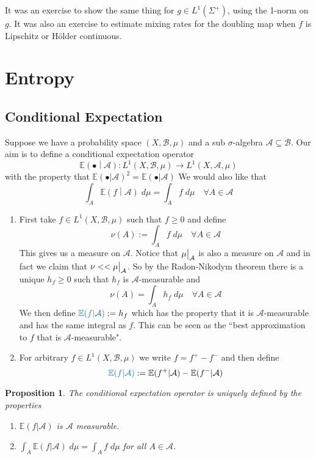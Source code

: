 \documentclass[11pt]{article}
\newcommand{\defeq}{:=}
\newcommand\restr[2]{{%
  \left.\kern-\nulldelimiterspace %
  #1 %
  \vphantom{\big|} %
  \right|_{#2} %
  }}
\newcommand{\relmiddle}[1]{\mathrel{}\middle#1\mathrel{}}
\newcommand{\rmv}{\relmiddle|}
\newcommand{\gvn}[2]{\ensuremath{\left(#1\rmv#2\right)}}
\newcommand{\expg}[2]{\ensuremath{\mathbb{E}\gvn{#1}{#2}}}
\newcommand{\dm}{\;d\mu}
\newcommand{\mdf}[1]{{\color{RoyalBlue} #1}}
\newtheorem{prop}{Proposition}[section]
\begin{document}
It was an exercise to show the same thing for $g\in L^1(\Sigma^+)$, using the 1-norm on $g$.
It was also an exercise to estimate mixing rates for the doubling map when $f$ is Lipschitz or H\"older continuous.

\section{Entropy}

\subsection{Conditional Expectation}
Suppose we have a probability space $(X, \mathcal{B}, \mu)$ and a sub $\sigma$-algebra $\mathcal{A} \subseteq \mathcal{B}$.
Our aim is to define a conditional expectation operator
\[
	\expg{\bullet}{\mathcal{A}}: L^1(X, \mathcal{B}, \mu) \to L^1(X, \mathcal{A}, \mu)
\]
with the property that $\mathbb{E}(\bullet | \mathcal{A})^2=\mathbb{E}(\bullet | \mathcal{A})$
We would also like that
\[
	\int_A \expg{f}{\mathcal{A}} \dm = \int_A f \dm \quad \forall A \in \mathcal{A}
\]

\begin{enumerate}
	\item First take $f\in L^1(X, \mathcal{B}, \mu)$ such that $f\geq 0$ and define
		\[
			\nu(A) \defeq \int_A f \dm \quad \forall A\in\mathcal{A}
		\]
		This gives us a measure on $\mathcal{A}$.
		Notice that $\restr{\mu}{\mathcal{A}}$ is also a measure on $\mathcal{A}$ and in fact we claim that $\nu << \restr{\mu}{\mathcal{A}}$.
		So by the Radon-Nikodym theorem there is a unique $h_f \geq 0$ such that $h_f$ is $\mathcal{A}$-measurable and
		\[
			\nu(A) = \int_A h_f \dm \quad \forall A\in\mathcal{A}
		\]
		We then define $\mdf{\mathbb{E}(f | \mathcal{A})} \defeq h_f$ which has the property that it is $\mathcal{A}$-measurable and has the same integral as $f$.
		This can be seen as the ``best approximation to $f$ that is $\mathcal{A}$-measurable".
	\item For arbitrary $f\in L^1(X, \mathcal{B}, \mu)$ we write $f= f^+ - f^-$ and then define
		\[
			\mdf{\mathbb{E}(f | \mathcal{A})} \defeq \mathbb{E}(f^+ | \mathcal{A}) - \mathbb{E}(f^- | \mathcal{A})
		\]
\end{enumerate}

\begin{prop}
\label{prop:condexpec}
The conditional expectation operator is uniquely defined by the properties
\begin{enumerate}[label=(\roman*)]
	\item $\mathbb{E}(f | \mathcal{A})$ is $\mathcal{A}$ measurable.
	\item $\int_A \mathbb{E}(f | \mathcal{A})\dm = \int_A f \dm$ for all $A\in \mathcal{A}$.
\end{enumerate}
\end{prop}
\end{document}
